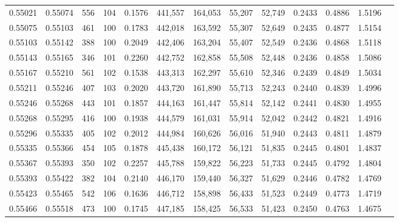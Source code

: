 \begin{tabular}{rrrrrrrrrrrrr}
0.55021 & 0.55074 &   556 & 104 &                                     0.1576 & 441,557 & 164,053 &  55,207 &  52,749 & 0.2433 & 0.4886 & 1.5196 \\
0.55075 & 0.55103 &   461 & 100 &                                     0.1783 & 442,018 & 163,592 &  55,307 &  52,649 & 0.2435 & 0.4877 & 1.5154 \\
0.55103 & 0.55142 &   388 & 100 &                                     0.2049 & 442,406 & 163,204 &  55,407 &  52,549 & 0.2436 & 0.4868 & 1.5118 \\
0.55143 & 0.55165 &   346 & 101 &                                     0.2260 & 442,752 & 162,858 &  55,508 &  52,448 & 0.2436 & 0.4858 & 1.5086 \\
0.55167 & 0.55210 &   561 & 102 &                                     0.1538 & 443,313 & 162,297 &  55,610 &  52,346 & 0.2439 & 0.4849 & 1.5034 \\
0.55211 & 0.55246 &   407 & 103 &                                     0.2020 & 443,720 & 161,890 &  55,713 &  52,243 & 0.2440 & 0.4839 & 1.4996 \\
0.55246 & 0.55268 &   443 & 101 &                                     0.1857 & 444,163 & 161,447 &  55,814 &  52,142 & 0.2441 & 0.4830 & 1.4955 \\
0.55268 & 0.55295 &   416 & 100 &                                     0.1938 & 444,579 & 161,031 &  55,914 &  52,042 & 0.2442 & 0.4821 & 1.4916 \\
0.55296 & 0.55335 &   405 & 102 &                                     0.2012 & 444,984 & 160,626 &  56,016 &  51,940 & 0.2443 & 0.4811 & 1.4879 \\
0.55335 & 0.55366 &   454 & 105 &                                     0.1878 & 445,438 & 160,172 &  56,121 &  51,835 & 0.2445 & 0.4801 & 1.4837 \\
0.55367 & 0.55393 &   350 & 102 &                                     0.2257 & 445,788 & 159,822 &  56,223 &  51,733 & 0.2445 & 0.4792 & 1.4804 \\
0.55393 & 0.55422 &   382 & 104 &                                     0.2140 & 446,170 & 159,440 &  56,327 &  51,629 & 0.2446 & 0.4782 & 1.4769 \\
0.55423 & 0.55465 &   542 & 106 &                                     0.1636 & 446,712 & 158,898 &  56,433 &  51,523 & 0.2449 & 0.4773 & 1.4719 \\
0.55466 & 0.55518 &   473 & 100 &                                     0.1745 & 447,185 & 158,425 &  56,533 &  51,423 & 0.2450 & 0.4763 & 1.4675 \\

\end{tabular}
